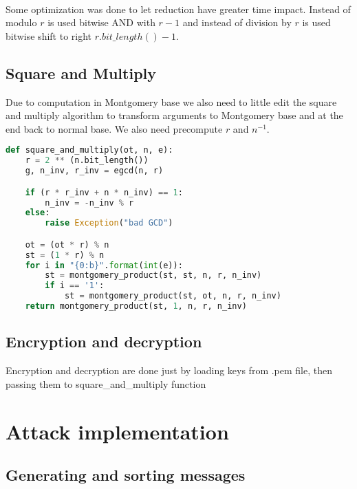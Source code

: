 \documentclass[thesis=B,english]{FITthesis}[2012/10/20]
\begin{document}
{\paragraph*{}{
Some optimization was done to let reduction have greater time impact. Instead of modulo \(r\) is used bitwise AND with \(r-1\) and instead of division by \(r\) is used bitwise
shift to right \(r.bit\_length() - 1\).
}

\subsection{Square and Multiply}{
Due to computation in Montgomery base we also need to little edit the square and multiply algorithm to transform arguments to Montgomery base and at the end back to normal base.
We also need precompute \(r\) and \(n^{-1}\).
}

\begin{lstlisting}[language=Python]
 def square_and_multiply(ot, n, e):
    r = 2 ** (n.bit_length())
    g, n_inv, r_inv = egcd(n, r)

    if (r * r_inv + n * n_inv) == 1:
        n_inv = -n_inv % r
    else:
        raise Exception("bad GCD")

    ot = (ot * r) % n
    st = (1 * r) % n
    for i in "{0:b}".format(int(e)):
        st = montgomery_product(st, st, n, r, n_inv)
        if i == '1':
            st = montgomery_product(st, ot, n, r, n_inv)
    return montgomery_product(st, 1, n, r, n_inv)
\end{lstlisting}

\subsection{Encryption and decryption}{
Encryption and decryption are done just by loading keys from .pem file, then passing them to square\_and\_multiply function
}

\section{Attack implementation}

\subsection{Generating and sorting messages}
}
\end{document}
